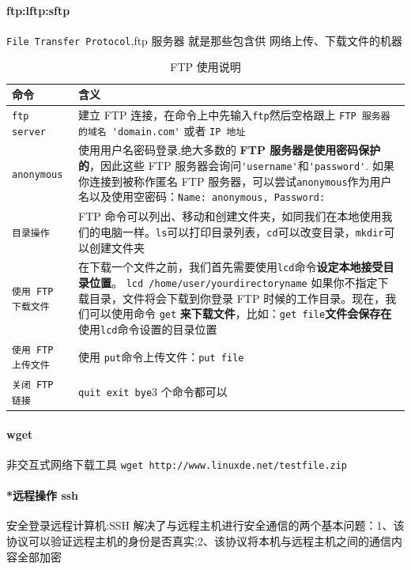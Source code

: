 \documentclass[UTF8,a4paper,12pt]{ctexbook}
\begin{document}
			\paragraph{ftp:lftp:sftp} \verb|File Transfer Protocol|,ftp 服务器 就是那些包含供 网络上传、下载文件的机器
				\begin{table}[H]
					\centering
					\caption{FTP 使用说明}
					\begin{tabular}{l|m{13cm}}
						\hline
						命令 	   	   & 含义\\
						\hline
						\verb|ftp server|	&  建立 FTP 连接，在命令上中先输入\verb|ftp|然后空格跟上 \verb|FTP 服务器的域名 'domain.com'| 或者 \verb|IP 地址|\\
						\verb|anonymous|	 &  使用用户名密码登录,绝大多数的 \textbf{FTP 服务器是使用密码保护的}，因此这些 FTP 服务器会询问\verb|'username'|和\verb|'password'|.	如果你连接到被称作匿名 FTP 服务器，可以尝试\verb|anonymous|作为用户名以及使用空密码：\verb|Name: anonymous, Password:|\\
						\verb|目录操作|	 &  FTP 命令可以列出、移动和创建文件夹，如同我们在本地使用我们的电脑一样。\verb|ls|可以打印目录列表，\verb|cd|可以改变目录，\verb|mkdir|可以创建文件夹\\
						\verb|使用 FTP 下载文件|		&  在下载一个文件之前，我们首先需要使用\verb|lcd|命令\textbf{设定本地接受目录位置}。
						\verb|lcd /home/user/yourdirectoryname| 如果你不指定下载目录，文件将会下载到你登录 FTP 时候的工作目录。现在，我们可以使用命令 \verb|get| \textbf{来下载文件}，比如：\verb|get file|\textbf{文件会保存在}使用\verb|lcd|命令设置的目录位置\\
						\verb|使用 FTP 上传文件|	 &  使用 \verb|put|命令上传文件：\verb|put file|\\
						\verb|关闭 FTP 链接| &  \verb|quit exit bye|3 个命令都可以\\
						\hline
					\end{tabular}
				\end{table}	
				
			\paragraph{wget} 非交互式网络下载工具 \verb|wget http://www.linuxde.net/testfile.zip|
			
			\paragraph{*远程操作 ssh} 安全登录远程计算机:SSH 解决了与远程主机进行安全通信的两个基本问题：1、该协议可以验证远程主机的身份是否真实;2、该协议将本机与远程主机之间的通信内容全部加密
				
\end{document}
